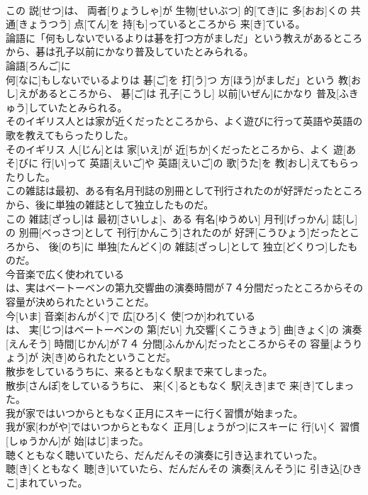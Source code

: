 \documentclass[8pt]{extreport}
\begin{document}
\begin{CJK}{UTF8}{min}
\\	この 説[せつ]は、 両者[りょうしゃ]が 生物[せいぶつ] 的[てき]に 多[おお]くの 共通[きょうつう] 点[てん]を 持[も]っているところから 来[き]ている。
\\	論語に「何もしないでいるよりは碁を打つ方がましだ」という教えがあるところから、碁は孔子以前にかなり普及していたとみられる。	
\\	論語[ろんご]に
\\	何[なに]もしないでいるよりは 碁[ご]を 打[う]つ 方[ほう]がましだ」という 教[おし]えがあるところから、 碁[ご]は 孔子[こうし] 以前[いぜん]にかなり 普及[ふきゅう]していたとみられる。
\\	そのイギリス人とは家が近くだったところから、よく遊びに行って英語や英語の歌を教えてもらったりした。	
\\	そのイギリス 人[じん]とは 家[いえ]が 近[ちか]くだったところから、よく 遊[あそ]びに 行[い]って 英語[えいご]や 英語[えいご]の 歌[うた]を 教[おし]えてもらったりした。
\\	この雑誌は最初、ある有名月刊誌の別冊として刊行されたのが好評だったところから、後に単独の雑誌として独立したものだ。	
\\	この 雑誌[ざっし]は 最初[さいしょ]、ある 有名[ゆうめい] 月刊[げっかん] 誌[し]の 別冊[べっさつ]として 刊行[かんこう]されたのが 好評[こうひょう]だったところから、 後[のち]に 単独[たんどく]の 雑誌[ざっし]として 独立[どくりつ]したものだ。
\\	今音楽で広く使われている
\\	は、実はベートーベンの第九交響曲の演奏時間が７４分間だったところからその容量が決められたということだ。	
\\	今[いま] 音楽[おんがく]で 広[ひろ]く 使[つか]われている 
\\	は、 実[じつ]はベートーベンの 第[だい] 九交響[くこうきょう] 曲[きょく]の 演奏[えんそう] 時間[じかん]が７４ 分間[ふんかん]だったところからその 容量[ようりょう]が 決[き]められたということだ。
\\	散歩をしているうちに、来るともなく駅まで来てしまった。	
\\	散歩[さんぽ]をしているうちに、 来[く]るともなく 駅[えき]まで 来[き]てしまった。
\\	我が家ではいつからともなく正月にスキーに行く習慣が始まった。	
\\	我が家[わがや]ではいつからともなく 正月[しょうがつ]にスキーに 行[い]く 習慣[しゅうかん]が 始[はじ]まった。
\\	聴くともなく聴いていたら、だんだんその演奏に引き込まれていった。	
\\	聴[き]くともなく 聴[き]いていたら、だんだんその 演奏[えんそう]に 引き込[ひきこ]まれていった。

\end{CJK}
\end{document}

